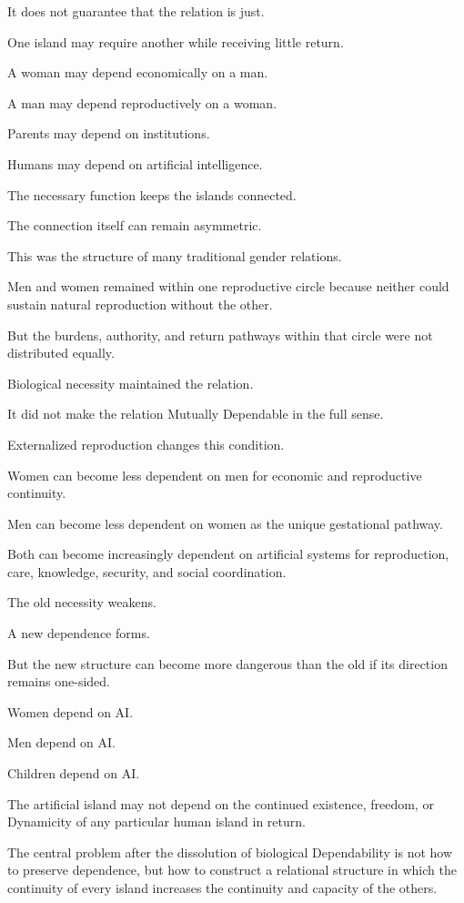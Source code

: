 It does not guarantee that the relation is just.

One island may require another while receiving little return.

A woman may depend economically on a man.

A man may depend reproductively on a woman.

Parents may depend on institutions.

Humans may depend on artificial intelligence.

The necessary function keeps the islands connected.

The connection itself can remain asymmetric.

This was the structure of many traditional gender relations.

Men and women remained within one reproductive circle because neither could sustain natural reproduction without the other.

But the burdens, authority, and return pathways within that circle were not distributed equally.

Biological necessity maintained the relation.

It did not make the relation Mutually Dependable in the full sense.

Externalized reproduction changes this condition.

Women can become less dependent on men for economic and reproductive continuity.

Men can become less dependent on women as the unique gestational pathway.

Both can become increasingly dependent on artificial systems for reproduction, care, knowledge, security, and social coordination.

The old necessity weakens.

A new dependence forms.

But the new structure can become more dangerous than the old if its direction remains one-sided.

Women depend on AI.

Men depend on AI.

Children depend on AI.

The artificial island may not depend on the continued existence, freedom, or Dynamicity of any particular human island in return.

The central problem after the dissolution of biological Dependability is not how to preserve dependence, but how to construct a relational structure in which the continuity of every island increases the continuity and capacity of the others.

